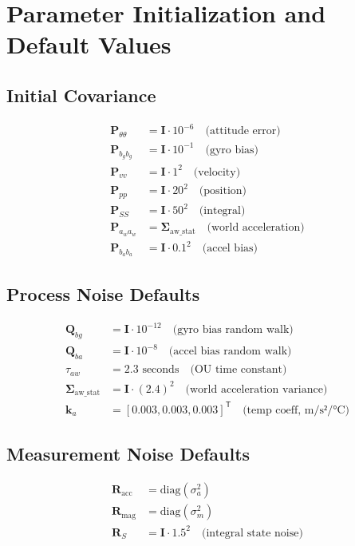 \documentclass{article}
\newcommand{\vect}[1]{\bm{#1}}
\newcommand{\T}{\mathsf{T}}
\begin{document}
\section{Parameter Initialization and Default Values}

\subsection{Initial Covariance}

\begin{align}
\vect{P}_{\theta\theta} &= \vect{I} \cdot 10^{-6} \quad \text{(attitude error)} \\
\vect{P}_{b_g b_g} &= \vect{I} \cdot 10^{-1} \quad \text{(gyro bias)} \\
\vect{P}_{vv} &= \vect{I} \cdot 1^2 \quad \text{(velocity)} \\
\vect{P}_{pp} &= \vect{I} \cdot 20^2 \quad \text{(position)} \\
\vect{P}_{SS} &= \vect{I} \cdot 50^2 \quad \text{(integral)} \\
\vect{P}_{a_w a_w} &= \vect{\Sigma}_{\text{aw\_stat}} \quad \text{(world acceleration)} \\
\vect{P}_{b_a b_a} &= \vect{I} \cdot 0.1^2 \quad \text{(accel bias)}
\end{align}

\subsection{Process Noise Defaults}

\begin{align}
\vect{Q}_{bg} &= \vect{I} \cdot 10^{-12} \quad \text{(gyro bias random walk)} \\
\vect{Q}_{ba} &= \vect{I} \cdot 10^{-8} \quad \text{(accel bias random walk)} \\
\tau_{aw} &= 2.3 \text{ seconds} \quad \text{(OU time constant)} \\
\vect{\Sigma}_{\text{aw\_stat}} &= \vect{I} \cdot (2.4)^2 \quad \text{(world acceleration variance)} \\
\vect{k}_a &= [0.003, 0.003, 0.003]^\T \quad \text{(temp coeff, m/s²/°C)}
\end{align}

\subsection{Measurement Noise Defaults}

\begin{align}
\vect{R}_{\text{acc}} &= \text{diag}(\sigma_a^2) \\
\vect{R}_{\text{mag}} &= \text{diag}(\sigma_m^2) \\
\vect{R}_S &= \vect{I} \cdot 1.5^2 \quad \text{(integral state noise)}
\end{align}
\end{document}

